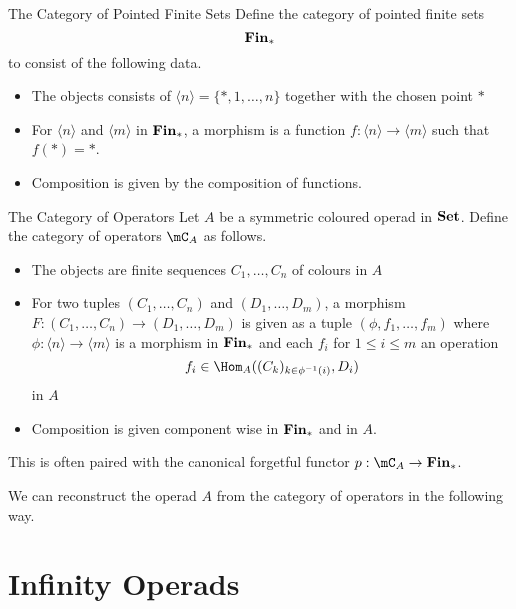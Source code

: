 \documentclass[a4paper]{article}
\begin{document}
\begin{defn}{The Category of Pointed Finite Sets}{} Define the category of pointed finite sets $$\bold{Fin}_\ast$$ to consist of the following data. 
\begin{itemize}
\item The objects consists of $\langle n\rangle=\{\ast,1,\dots,n\}$ together with the chosen point $\ast$
\item For $\langle n\rangle$ and $\langle m\rangle $ in $\bold{Fin}_\ast$, a morphism is a function $f:\langle n\rangle\to\langle m\rangle$ such that $f(\ast)=\ast$. 
\item Composition is given by the composition of functions. 
\end{itemize}
\end{defn}

\begin{defn}{The Category of Operators}{} Let $A$ be a symmetric coloured operad in $\bold{Set}$. Define the category of operators $\mC_A$ as follows. 
\begin{itemize}
\item The objects are finite sequences $C_1,\dots,C_n$ of colours in $A$
\item For two tuples $(C_1,\dots,C_n)$ and $(D_1,\dots,D_m)$, a morphism $F:(C_1,\dots,C_n)\to(D_1,\dots,D_m)$ is given as a tuple $(\phi,f_1,\dots,f_m)$ where $\phi:\langle n\rangle\to\langle m\rangle$ is a morphism in $\bold{Fin}_\ast$ and each $f_i$ for $1\leq i\leq m$ an operation $$f_i\in\Hom_A((C_k)_{k\in\phi^{-1}(i)},D_i)$$ in $A$
\item Composition is given component wise in $\bold{Fin}_\ast$ and in $A$. 
\end{itemize}
This is often paired with the canonical forgetful functor $p:\mC_A\to\bold{Fin}_\ast$. 
\end{defn}

We can reconstruct the operad $A$ from the category of operators in the following way. 

\pagebreak
\section{Infinity Operads}
\
\end{document}
